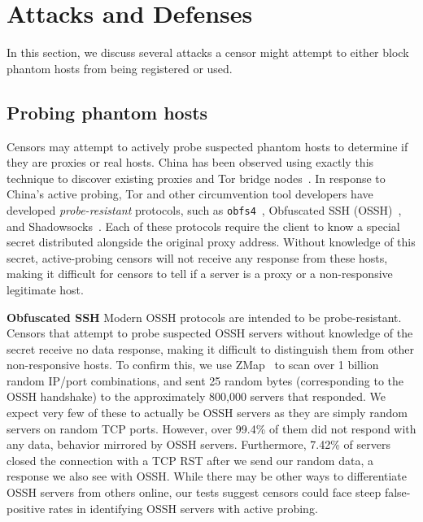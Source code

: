 \documentclass[sigconf]{acmart}
\renewcommand{\paragraph}[1]{\smallskip\noindent\textbf{#1\quad}}
\begin{document}
\section{Attacks and Defenses}
\label{sec:attacks}

In this section, we discuss several attacks a censor might attempt to either
block phantom hosts from being registered or used.


\subsection{Probing phantom hosts}
Censors may attempt to actively probe suspected phantom hosts to determine if
they are proxies or real hosts. China has been observed using exactly this technique to
discover existing proxies and Tor bridge
nodes~\cite{tor-bridge-blocking-blog,active-probe,ensafi-tor,china-blocking-tor}.
In response to China's active probing, Tor and other circumvention tool developers have developed
\emph{probe-resistant} protocols, such as \texttt{obfs4}~\cite{obfs4}, Obfuscated SSH
(OSSH)~\cite{ossh}, and Shadowsocks~\cite{shadowsocks}. Each of these protocols
require the client to know a special secret distributed alongside the original
proxy address. Without knowledge of this secret, active-probing censors will not
receive any response from these hosts, making it difficult for censors to tell if
a server is a proxy or a non-responsive legitimate host.

\paragraph{Obfuscated SSH} Modern OSSH protocols are intended to be
probe-resistant. Censors that attempt to probe suspected OSSH servers without
knowledge of the secret receive no data response, making it difficult to
distinguish them from other non-responsive hosts. To confirm this, we use
ZMap~\cite{zmap13} to scan over 1 billion random IP/port combinations, and sent 25
random bytes (corresponding to the OSSH handshake) to the approximately 800,000
servers that responded. We expect very few of these to actually be OSSH
servers as they are simply random servers on random TCP ports.
However, over 99.4\% of them did not respond with any data, behavior mirrored by
OSSH servers.
Furthermore, 7.42\% of servers closed the connection with a TCP RST
after we send our random data, a response we also see with OSSH. While there may
be other ways to differentiate OSSH servers from others online, our tests
suggest censors could face steep false-positive rates in identifying OSSH
servers with active probing.
\end{document}
